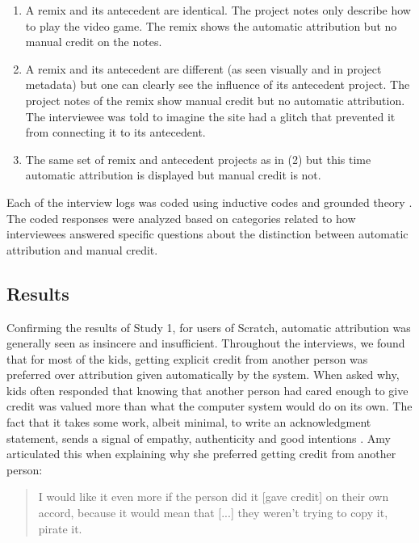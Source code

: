 \begin{enumerate}

\item A remix and its antecedent are identical. The project notes only
  describe how to play the video game. The remix shows the automatic
  attribution but no manual credit on the notes.

\item A remix and its antecedent are different (as seen visually and
  in project metadata) but one can clearly see the influence of its
  antecedent project. The project notes of the remix show manual
  credit but no automatic attribution. The interviewee was told to
  imagine the site had a glitch that prevented it from connecting it
  to its antecedent.

\item The same set of remix and antecedent projects as in (2) but this
  time automatic attribution is displayed but manual credit is not.

\end{enumerate}

Each of the interview logs was coded using
inductive codes and grounded theory \cite{charmaz_constructing_2006}.
The coded responses were analyzed based on categories related to how
interviewees answered specific questions about the distinction between
automatic attribution and manual credit.

\subsection{Results}

Confirming the results of Study 1, for users of Scratch, automatic
attribution was generally seen as insincere and insufficient.
Throughout the interviews, we found that for most of the kids, getting
explicit credit from another person was preferred over attribution
given automatically by the system. When asked why, kids often
responded that knowing that another person had cared enough to give
credit was valued more than what the computer system would do on its
own. The fact that it takes some work, albeit minimal, to write an
acknowledgment statement, sends a signal of empathy, authenticity and
good intentions \cite{donath_signals_2008}. Amy articulated this when
explaining why she preferred getting credit from another person:

\begin{quote}
  I would like it even more if the person did it [gave credit] on their own accord,
  because it would mean that [...] they weren't
  trying to copy it, pirate it.
\end{quote}

